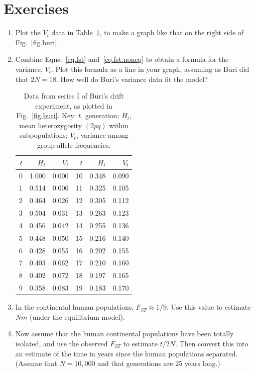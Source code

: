 \documentclass[twocolumn]{article}
\begin{document}
\section*{Exercises}
\begin{enumerate}
\item
Plot the $V_t$ data in Table~\ref{tab.buri}, to make a graph like that
on the right side of Fig.~\ref{fig.buri}.

\item
Combine Eqns.~\ref{eq.fst} and~\ref{eq.fst.noneq} to obtain a
formula for the variance, $V_t$.  Plot this formula as a line in your
graph, assuming as Buri did that $2N = 18$.  How well do Buri's
variance data fit the model?

\begin{table}[htb]
  \caption{Data from series I of Buri's \citep{Buri:E-10-367} drift
    experiment, as plotted in Fig.~\ref{fig.buri}. Key: $t$, generation;
    $H_t$, mean heterozygosity $(2pq)$ within subpopulations; $V_t$,
    variance among group allele frequencies.}
\label{tab.buri}
\centering
\begin{tabular}{rrr|rrr}
 $t$ & $H_t$ & $V_t$ & $t$ & $H_t$ & $V_t$ \\ \hline
 0 & 1.000 & 0.000 & 10 & 0.348 & 0.090\\
 1 & 0.514 & 0.006 & 11 & 0.325 & 0.105\\
 2 & 0.464 & 0.026 & 12 & 0.305 & 0.112\\
 3 & 0.504 & 0.031 & 13 & 0.263 & 0.123\\
 4 & 0.456 & 0.042 & 14 & 0.255 & 0.136\\
 5 & 0.448 & 0.050 & 15 & 0.216 & 0.140\\
 6 & 0.428 & 0.055 & 16 & 0.202 & 0.155\\
 7 & 0.403 & 0.062 & 17 & 0.210 & 0.160\\
 8 & 0.402 & 0.072 & 18 & 0.197 & 0.165\\
 9 & 0.358 & 0.083 & 19 & 0.183 & 0.170\\
\hline
\end{tabular}
\end{table}

\item In the continental human populations, $F_{ST} \approx 1/9$.  Use
  this value to estimate $Nm$ (under the equilibrium model).

\item Now assume that the human continental populations have been
  totally isolated, and use the observed $F_{ST}$ to estimate $t/2N$. 
  Then convert this into an estimate of the time in years since the
  human populations separated.  (Assume that $N=10,000$ and that
  generations are 25 years long.) 
\end{enumerate}



\end{document}
